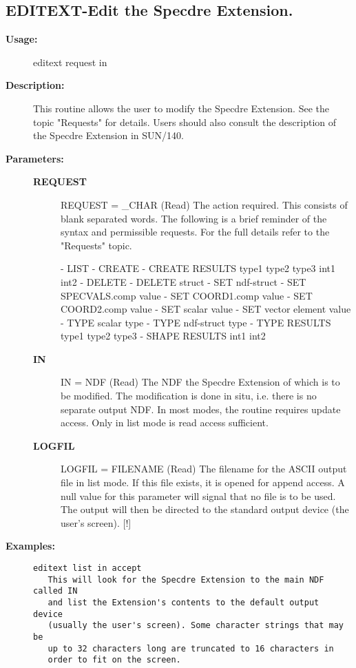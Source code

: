 \subsection{EDITEXT-\label{EDITEXT}Edit the Specdre Extension.}
\begin{description}

\item [{\bf Usage:}]

   editext request in


\item [{\bf Description:}]

   This routine allows the user to modify the Specdre Extension. See
   the topic "Requests" for details. Users should also consult the
   description of the Specdre Extension in SUN/140.

\item [{\bf Parameters:}]
\begin{description}
\item [{\bf REQUEST}]
REQUEST = _CHAR (Read)
   The action required. This consists of blank separated words.
   The following is a brief reminder of the syntax and permissible
   requests. For the full details refer to the "Requests" topic.

   -  LIST
   -  CREATE
   -  CREATE RESULTS type1 type2 type3 int1 int2
   -  DELETE
   -  DELETE struct
   -  SET ndf-struct
   -  SET SPECVALS.comp value
   -  SET COORD1.comp value
   -  SET COORD2.comp value
   -  SET scalar value
   -  SET vector element value
   -  TYPE scalar type
   -  TYPE ndf-struct type
   -  TYPE RESULTS type1 type2 type3
   -  SHAPE RESULTS int1 int2
\item [{\bf IN}]
IN = NDF (Read)
   The NDF the Specdre Extension of which is to be modified. The
   modification is done in situ, i.e. there is no separate output
   NDF. In most modes, the routine requires update access. Only in
   list mode is read access sufficient.
\item [{\bf LOGFIL}]
LOGFIL = FILENAME (Read)
   The filename for the ASCII output file in list mode. If this
   file exists, it is opened for append access. A null value for
   this parameter will signal that no file is to be used. The
   output will then be directed to the standard output device (the
   user's screen).
   [!]
\end{description}

\item [{\bf Examples:}]
\begin{verbatim}
editext list in accept
   This will look for the Specdre Extension to the main NDF called IN
   and list the Extension's contents to the default output device
   (usually the user's screen). Some character strings that may be
   up to 32 characters long are truncated to 16 characters in
   order to fit on the screen.


\end{verbatim}
\end{description}
